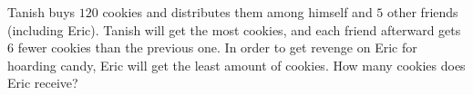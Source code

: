 Tanish buys $120$ cookies and distributes them among himself and $5$ other friends (including Eric). Tanish will get the most cookies, and each friend afterward gets $6$ fewer cookies than the previous one. In order to get revenge on Eric for hoarding candy, Eric will get the least amount of cookies. How many cookies does Eric receive?
